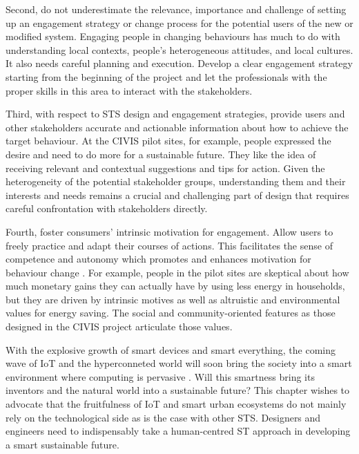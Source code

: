 Second, do not underestimate the relevance, importance and challenge of setting up an engagement strategy or change process for the potential users of the new or modified system.
Engaging people in changing behaviours has much to do with understanding local contexts, people's heterogeneous attitudes, and local cultures. It also needs careful planning and execution.
Develop a clear engagement strategy starting from the beginning of the project and let the professionals with the proper skills in this area to interact with the stakeholders. 
% 

Third, with respect to STS design and engagement strategies, provide users and other stakeholders accurate and actionable information about how to achieve the  target behaviour. At the CIVIS pilot sites, for example,  people expressed the desire and need to do more for a sustainable future. They like the idea of receiving relevant and contextual suggestions and tips for action. Given the heterogeneity of the potential stakeholder groups, understanding them and their interests and needs remains a crucial and challenging part of design that requires careful confrontation with stakeholders directly.
% 

Fourth, foster consumers' intrinsic motivation for engagement. Allow users to freely practice and adapt their courses of actions. This facilitates the sense of competence and autonomy which promotes and enhances motivation for behaviour change \cite{Ryan2000}. 
For example, people in the pilot sites are skeptical about how much monetary gains they can actually have by using less energy in households, but they are driven by intrinsic motives as well as altruistic and environmental values for energy saving. The social and community-oriented features as those designed in the CIVIS project  articulate those values. 

With the explosive growth of smart devices and smart everything, the coming wave of  IoT and the hyperconneted world will soon bring the society into a smart environment where computing is pervasive \cite{gubbi2013internet,Shin2014}. Will this smartness bring its inventors and the natural world into a sustainable future? This chapter wishes to advocate that the fruitfulness of IoT and smart urban ecosystems do not mainly rely on the technological side as is the case with other STS. Designers and engineers need to indispensably take a human-centred ST approach in developing a smart sustainable future.   


